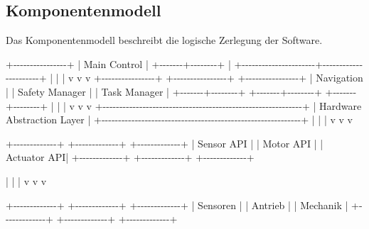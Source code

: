 \documentclass[
  a4paper,
  12pt,
  DIV=12,        %
  parskip=half,  %
  headings=small %
]{scrartcl}
\theoremstyle{definition}
\theoremstyle{definition}
\newenvironment{Shaded}{}{}
\newcommand{\NormalTok}[1]{#1}
\begin{document}
\subsection{Komponentenmodell}\label{komponentenmodell}

Das Komponentenmodell beschreibt die logische Zerlegung der Software.

\begin{Shaded}
\begin{Highlighting}[]
\NormalTok{                         +{-}{-}{-}{-}{-}{-}{-}{-}{-}{-}{-}{-}{-}{-}{-}{-}+}
\NormalTok{                         |  Main Control  |}
\NormalTok{                         +{-}{-}{-}{-}{-}{-}{-}+{-}{-}{-}{-}{-}{-}{-}{-}+}
\NormalTok{                                 |}
\NormalTok{          +{-}{-}{-}{-}{-}{-}{-}{-}{-}{-}{-}{-}{-}{-}{-}{-}{-}{-}{-}{-}{-}{-}+{-}{-}{-}{-}{-}{-}{-}{-}{-}{-}{-}{-}{-}{-}{-}{-}{-}{-}{-}{-}{-}{-}+}
\NormalTok{          |                      |                      |}
\NormalTok{          v                      v                      v}
\NormalTok{+{-}{-}{-}{-}{-}{-}{-}{-}{-}{-}{-}{-}{-}{-}{-}{-}+    +{-}{-}{-}{-}{-}{-}{-}{-}{-}{-}{-}{-}{-}{-}{-}{-}+    +{-}{-}{-}{-}{-}{-}{-}{-}{-}{-}{-}{-}{-}{-}{-}{-}+}
\NormalTok{| Navigation     |    | Safety Manager |    | Task Manager   |}
\NormalTok{+{-}{-}{-}{-}{-}{-}{-}+{-}{-}{-}{-}{-}{-}{-}{-}+    +{-}{-}{-}{-}{-}{-}{-}+{-}{-}{-}{-}{-}{-}{-}{-}+    +{-}{-}{-}{-}{-}{-}{-}+{-}{-}{-}{-}{-}{-}{-}{-}+}
\NormalTok{        |                     |                     |}
\NormalTok{        v                     v                     v}
\NormalTok{+{-}{-}{-}{-}{-}{-}{-}{-}{-}{-}{-}{-}{-}{-}{-}{-}{-}{-}{-}{-}{-}{-}{-}{-}{-}{-}{-}{-}{-}{-}{-}{-}{-}{-}{-}{-}{-}{-}{-}{-}{-}{-}{-}{-}{-}{-}{-}{-}{-}{-}{-}{-}{-}{-}{-}{-}{-}{-}{-}{-}+}
\NormalTok{|              Hardware Abstraction Layer                    |}
\NormalTok{+{-}{-}{-}{-}{-}{-}{-}{-}{-}{-}{-}{-}{-}{-}{-}{-}{-}{-}{-}{-}{-}{-}{-}{-}{-}{-}{-}{-}{-}{-}{-}{-}{-}{-}{-}{-}{-}{-}{-}{-}{-}{-}{-}{-}{-}{-}{-}{-}{-}{-}{-}{-}{-}{-}{-}{-}{-}{-}{-}{-}+}
\NormalTok{        |                     |                     |}
\NormalTok{        v                     v                     v}

\NormalTok{+{-}{-}{-}{-}{-}{-}{-}{-}{-}{-}{-}{-}{-}+       +{-}{-}{-}{-}{-}{-}{-}{-}{-}{-}{-}{-}{-}+       +{-}{-}{-}{-}{-}{-}{-}{-}{-}{-}{-}{-}{-}+}
\NormalTok{| Sensor API  |       | Motor API   |       | Actuator API|}
\NormalTok{+{-}{-}{-}{-}{-}{-}{-}{-}{-}{-}{-}{-}{-}+       +{-}{-}{-}{-}{-}{-}{-}{-}{-}{-}{-}{-}{-}+       +{-}{-}{-}{-}{-}{-}{-}{-}{-}{-}{-}{-}{-}+}

\NormalTok{        |                     |                     |}
\NormalTok{        v                     v                     v}

\NormalTok{+{-}{-}{-}{-}{-}{-}{-}{-}{-}{-}{-}{-}{-}+       +{-}{-}{-}{-}{-}{-}{-}{-}{-}{-}{-}{-}{-}+       +{-}{-}{-}{-}{-}{-}{-}{-}{-}{-}{-}{-}{-}+}
\NormalTok{| Sensoren    |       | Antrieb     |       | Mechanik    |}
\NormalTok{+{-}{-}{-}{-}{-}{-}{-}{-}{-}{-}{-}{-}{-}+       +{-}{-}{-}{-}{-}{-}{-}{-}{-}{-}{-}{-}{-}+       +{-}{-}{-}{-}{-}{-}{-}{-}{-}{-}{-}{-}{-}+}
\end{Highlighting}
\end{Shaded}
\end{document}
